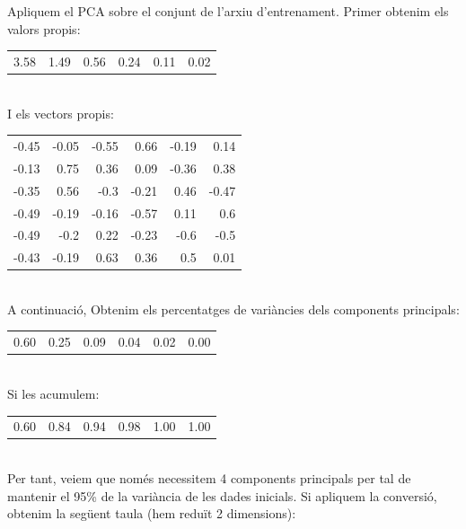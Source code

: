 \documentclass{article} %
\begin{document}
{\color{blue} \leftmargin=4in
	Apliquem el PCA sobre el conjunt de l'arxiu d'entrenament. Primer obtenim els valors propis: \\

	{\selectfont\small
	\begin{tabular}{r r r r r r}
		3.58 & 1.49 & 0.56 & 0.24 & 0.11 & 0.02 \\
	\end{tabular}
	} \\

	I els vectors propis: \\

	{\selectfont\small
	\begin{tabular}{r r r r r r}
		-0.45 &  -0.05 &  -0.55 &  0.66 &  -0.19 &  0.14 \\
		-0.13 &  0.75 &  0.36 &  0.09 &  -0.36 &  0.38 \\
		-0.35 &  0.56 &  -0.3 &  -0.21 &  0.46 &  -0.47 \\
		-0.49 &  -0.19 &  -0.16 &  -0.57 &  0.11 &  0.6 \\
		-0.49 &  -0.2 &  0.22 &  -0.23 &  -0.6 &  -0.5 \\
		-0.43 &  -0.19 &  0.63 &  0.36 &  0.5 &  0.01 \\
	\end{tabular}
	} \\

	A continuació, Obtenim els percentatges de variàncies dels components principals: \\

	{\selectfont\small
	\begin{tabular}{r r r r r r}
		0.60 & 0.25 & 0.09 & 0.04 & 0.02 & 0.00 \\
	\end{tabular}
	} \\

	Si les acumulem: \\

	{\selectfont\small
	\begin{tabular}{r r r r r r}
		0.60 & 0.84 & 0.94 & 0.98 & 1.00 & 1.00 \\
	\end{tabular}
	} \\

	Per tant, veiem que només necessitem 4 components principals per tal de mantenir el 95\% de la variància de les dades inicials. Si apliquem la conversió, obtenim la següent taula (hem reduït 2 dimensions): \\

}
\end{document}
